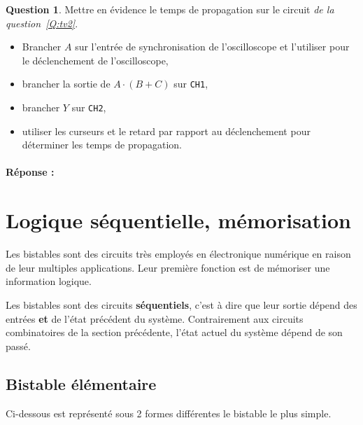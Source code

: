 \documentclass[11pt,a4paper]{article}
\theoremstyle{definition}%
\newtheorem{Q}{Question}[] %
\newcommand{\reponse}[1]{%
	\ifthenelse {\boolean{corrige}} {\paragraph{Réponse :} \color{darkblue}   #1\color{black}} {}
 }
\begin{document}
\begin{Q}
	Mettre en évidence le temps de propagation sur le circuit \textit{de la question~\ref{Q:tv2}}.
	\begin{itemize}
	\item Brancher $A$ sur l'entrée de synchronisation de l'oscilloscope et l'utiliser pour le déclenchement de l'oscilloscope,
	\item brancher la sortie de $A\cdot(B+C)$ sur \verb!CH1!,
	\item brancher $Y$ sur \verb!CH2!,
	\item utiliser les curseurs et le retard par rapport au déclenchement pour déterminer les temps de propagation.
	\end{itemize}%
	\label{Q:1}
	\reponse{}%
\end{Q}

\newpage
\section{Logique séquentielle, mémorisation}

Les bistables sont des circuits très employés en électronique numérique en raison de leur multiples applications. Leur première fonction est de mémoriser une information logique.

Les bistables sont des circuits \textbf{séquentiels}, c'est à dire que leur sortie dépend des entrées \textbf{et} de l'état précédent du système. Contrairement aux circuits combinatoires de la section précédente, l'état actuel du système dépend de son passé.

\subsection{Bistable élémentaire}
Ci-dessous est représenté sous 2 formes différentes le bistable le plus simple.
\end{document}
